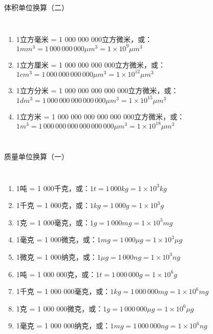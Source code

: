 \documentclass[aspectratio=169]{ctexbeamer} %
\begin{document}
\begin{frame}[t]{体积单位换算（二）}
\begin{columns}
\begin{enumerate}[label={\Alph*.}]
\item 1立方毫米 = 1 000 000 000立方微米，或：$1mm^3 = 1 \, 000 \, 000 \, 000 \mu m^3 = 1 \times 10^{9} \mu m^3$ 
\item 1立方厘米 = 1 000 000 000 000立方微米，或：$1cm^3 = 1  \, 000 \, 000 \, 000 \, 000 \mu m^3 = 1 \times 10^{12} \mu m^3$ 
\item 1立方分米 = 1 000 000 000 000 000立方微米，或：$1dm^3 = 1 \, 000 \, 000 \, 000 \, 000 \, 000 \mu m^3 = 1 \times 10^{15} \mu m^3$ 
\item 1立方米 = 1 000 000 000 000 000 000立方微米，或：$1m^3 = 1 \, 000 \, 000 \, 000 \, 000 \, 000 \, 000 \mu m^3 = 1 \times 10^{18} \mu m^3$ 
\end{enumerate}
\end{columns}
\end{frame}

\begin{frame}[t]{质量单位换算（一）}
\begin{columns}
\begin{enumerate}[label={\Alph*.}]
\item 1吨 = 1 000千克，或：$1 t = 1 \, 000 kg = 1 \times 10^{3} kg$ 
\item 1千克 = 1 000克，或：$1 kg = 1 \, 000 g = 1 \times 10^{3} g$ 
\item 1克 = 1 000毫克，或：$1 g = 1 \, 000 mg = 1 \times 10^{3} mg$ 
\item 1毫克 = 1 000微克，或：$1 mg = 1 \, 000 \mu g = 1 \times 10^{3} \mu g$ 
\item 1微克 = 1 000纳克，或：$1 \mu g = 1 \, 000 ng = 1 \times 10^{3} ng$ 
\item 1吨 = 1 000 000克，或：$1 t = 1 \, 000 \, 000 g = 1 \times 10^{6} g$ 
\item 1千克 = 1 000 000毫克，或：$1 kg = 1 \, 000 \, 000 mg = 1 \times 10^{6} mg$ 
\item 1克 = 1 000 000微克，或：$1 g = 1 \, 000 \, 000 \mu g = 1 \times 10^{6} \mu g$ 
\item 1毫克 = 1 000 000纳克，或：$1 mg = 1 \, 000 \, 000 ng = 1 \times 10^{6} ng$ 

\end{enumerate}
\end{columns}
\end{frame}
\end{document}
